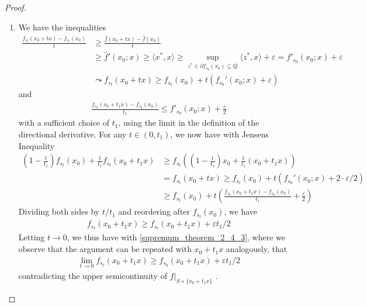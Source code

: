 \documentclass[10pt, leqno]{amsart}
\theoremstyle{definition}
\theoremstyle{remark}
\begin{document}
\begin{proof}
\begin{enumerate}[label=(\roman*), wide]
\begin{enumerate}[label=(\alph*), wide]
\begin{enumerate}[label=\arabic*., wide]
                    \item We have the inequalities
                    \begin{align}
                        \frac{f_{s_t}(x_0+tx)-f_{s_t}(x_0)}{t} &\geq \frac{\hat{f}(x_0+tx)-\hat{f}(x_0)}{t}\\
                        &\geq \hat{f}'(x_0; x) \geq \langle x^*, x \rangle \geq \sup_{z^* \in \partial f_{s_0}(x_0) \subseteq Q} \langle z^*, x \rangle + \varepsilon = f'_{s_0}(x_0; x) + \varepsilon\\
                        &\leadsto f_{s_t}(x_0+tx) \geq f_{s_t}(x_0) + t(f_{s_0}'(x_0; x) + \varepsilon)
                    \end{align}
                    and
                    \begin{align}
                        \frac{f_{s_0}(x_0+t_1x)-f_{s_0}(x_0)}{t_1} \leq f'_{s_0}(x_0; x) + \frac{\varepsilon}{2}
                    \end{align}
                    with a sufficient choice of \(t_1\), using the limit in the definition of the directional derivative. For any \(t \in (0, t_1)\), we now have with Jensens Inequality
                    \begin{align}
                        \left(1-\frac{t}{t_1}\right) f_{s_t}(x_0) + \frac{t}{t_1} f_{s_t}(x_0+t_1x) &\geq f_{s_t}\left(\left(1-\frac{t}{t_1}\right)x_0+\frac{t}{t_1}(x_0+t_1x)\right)\\
                        &= f_{s_t}(x_0+tx) \geq f_{s_t}(x_0) + t(f_{s_0}'(x_0; x)+2 \cdot \varepsilon / 2)\\
                        &\geq f_{s_t}(x_0)+t\left(\frac{f_{s_0}(x_0+t_1x)-f_{s_0}(x_0)}{t_1}+\frac{\varepsilon}{2}\right)
                    \end{align}
                    Dividing both sides by \(t/t_1\) and reordering after \(f_{s_t}(x_0)\), we have
                    \begin{align}
                        f_{s_t}(x_0+t_1x) \geq f_{s_t}(x_0+t_1x) + \varepsilon t_1 / 2
                    \end{align}
                    Letting \(t \to 0\), we thus have with \ref{supremum_theorem_2_4_3}, where we observe that the argument can be repeated with \(x_0+t_1 x\) analogously, that
                    \begin{align}
                        \lim_{t \to 0} f_{s_t}(x_0+t_1x) \geq f_{s_0}(x_0+t_1x) + \varepsilon t_1/2
                    \end{align}
                    contradicting the upper semicontinuity of \(f|_{S \times \{x_0+t_1x\}}\) \lightning.
                    

\end{enumerate}
\end{enumerate}
\end{enumerate}
\end{proof}
\end{document}
